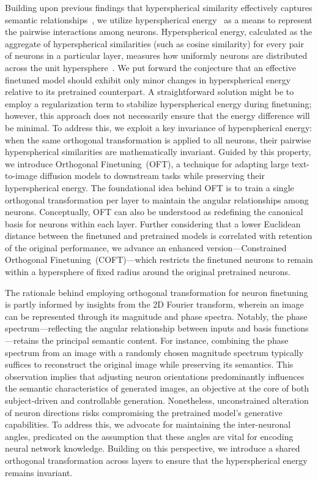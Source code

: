 Building upon previous findings that hyperspherical similarity effectively captures semantic relationships~\cite{liu2017deep,liu2018decoupled,chen2020angular}, we utilize hyperspherical energy~\cite{liu2018learning} as a means to represent the pairwise interactions among neurons. Hyperspherical energy, calculated as the aggregate of hyperspherical similarities (such as cosine similarity) for every pair of neurons in a particular layer, measures how uniformly neurons are distributed across the unit hypersphere~\cite{liu2021learning}. We put forward the conjecture that an effective finetuned model should exhibit only minor changes in hyperspherical energy relative to its pretrained counterpart. A straightforward solution might be to employ a regularization term to stabilize hyperspherical energy during finetuning; however, this approach does not necessarily ensure that the energy difference will be minimal. To address this, we exploit a key invariance of hyperspherical energy: when the same orthogonal transformation is applied to all neurons, their pairwise hyperspherical similarities are mathematically invariant. Guided by this property, we introduce Orthogonal Finetuning~(OFT), a technique for adapting large text-to-image diffusion models to downstream tasks while preserving their hyperspherical energy. The foundational idea behind OFT is to train a single orthogonal transformation per layer to maintain the angular relationships among neurons. Conceptually, OFT can also be understood as redefining the canonical basis for neurons within each layer. Further considering that a lower Euclidean distance between the finetuned and pretrained models is correlated with retention of the original performance, we advance an enhanced version—Constrained Orthogonal Finetuning~(COFT)—which restricts the finetuned neurons to remain within a hypersphere of fixed radius around the original pretrained neurons.

The rationale behind employing orthogonal transformation for neuron finetuning is partly informed by insights from the 2D Fourier transform, wherein an image can be represented through its magnitude and phase spectra. Notably, the phase spectrum—reflecting the angular relationship between inputs and basis functions—retains the principal semantic content. For instance, combining the phase spectrum from an image with a randomly chosen magnitude spectrum typically suffices to reconstruct the original image while preserving its semantics. This observation implies that adjusting neuron orientations predominantly influences the semantic characteristics of generated images, an objective at the core of both subject-driven and controllable generation. Nonetheless, unconstrained alteration of neuron directions risks compromising the pretrained model’s generative capabilities. To address this, we advocate for maintaining the inter-neuronal angles, predicated on the assumption that these angles are vital for encoding neural network knowledge. Building on this perspective, we introduce a shared orthogonal transformation across layers to ensure that the hyperspherical energy remains invariant.


